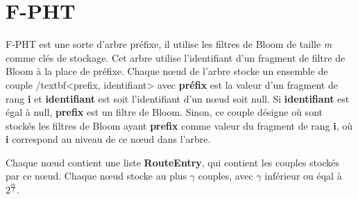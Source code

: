 \documentclass[a4paper,11pt]{report}
\begin{document}
\newpage

\section{F-PHT}
	F-PHT est une sorte d'arbre préfixe, il utilise  les filtres de Bloom  de taille \textit{m} comme clés de stockage. Cet arbre utilise l'identifiant d'un fragment de filtre de Bloom à la place de préfixe. Chaque nœud de l'arbre stocke un ensemble de couple /textbf{<prefix, identifiant>} avec \textbf{préfix} est la valeur d'un fragment de rang \textbf{i} et \textbf{identifiant} est soit l'identifiant d'un nœud soit null. Si \textbf{identifiant} est égal à null, \textbf{prefix} est un filtre de Bloom. Sinon, ce couple désigne où sont stockés les filtres de Bloom ayant \textbf{prefix} comme valeur du fragment de rang \textbf{i}, où \textbf{i} correspond au niveau de ce nœud dans l'arbre.

	Chaque nœud contient une liste \textbf{RouteEntry}, qui contient les couples stockés par ce nœud. Chaque nœud stocke au plus $\gamma$ couples, avec $\gamma$ inférieur ou éqal à $2^{\frac{m}{f}}$.
\end{document}
